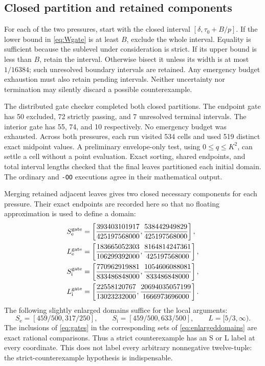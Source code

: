 \documentclass[11pt]{amsart}
\numberwithin{equation}{section}
\begin{document}
\subsection{Closed partition and retained components}

For each of the two pressures, start with the closed interval
$[\delta,\tau_0+B/p]$. If the lower bound in
\eqref{eq:Wgate} is at least $B$, exclude the whole interval.
Equality is sufficient because the sublevel under consideration is
strict. If its upper bound is less than $B$, retain the interval.
Otherwise bisect it unless its width is at most $1/16384$; such
unresolved boundary intervals are retained. Any emergency budget
exhaustion must also retain pending intervals. Neither uncertainty
nor termination may silently discard a possible counterexample.

The distributed gate checker completed both closed partitions.
The endpoint gate has 50 excluded, 72 strictly passing,
and 7 unresolved terminal intervals. The interior gate has 55,
74, and 10 respectively. No emergency budget was exhausted.
Across both pressures, each run visited 534 cells and used 519
distinct exact midpoint values. A preliminary envelope-only test,
using $0\leq q\leq K^2$, can settle a cell without a point evaluation.
Exact sorting, shared
endpoints, and total interval lengths checked that the final leaves
partitioned each initial domain. The ordinary and \texttt{-OO}
executions agree in their mathematical output.

Merging retained adjacent leaves gives two closed necessary components
for each pressure. Their exact endpoints are recorded here so that
no floating approximation is used to define a domain:
\begin{align}
 S_{\mathrm e}^{\rm gate}
 &=\left[\frac{393403101917}{425197568000},
         \frac{538442949829}{425197568000}\right],\nonumber\\
 L_{\mathrm e}^{\rm gate}
 &=\left[\frac{183665052303}{106299392000},
         \frac{8164814247361}{425197568000}\right],\label{eq:gates}\\
 S_{\mathrm i}^{\rm gate}
 &=\left[\frac{770962919881}{833486848000},
         \frac{1054606088081}{833486848000}\right],\nonumber\\
 L_{\mathrm i}^{\rm gate}
 &=\left[\frac{22558120767}{13023232000},
         \frac{20694035057199}{1666973696000}\right].\nonumber
\end{align}
The following slightly enlarged domains suffice for the local
arguments:
\begin{equation}\label{eq:enlargeddomains}
 S_{\mathrm e}=[459/500,317/250],\qquad
 S_{\mathrm i}=[459/500,633/500],\qquad L=[5/3,\infty).
\end{equation}
The inclusions of \eqref{eq:gates} in the corresponding sets of
\eqref{eq:enlargeddomains} are exact rational comparisons. Thus a
strict counterexample has an S or L label at every coordinate.
This does not label every arbitrary nonnegative twelve-tuple: the
strict-counterexample hypothesis is indispensable.
\end{document}
